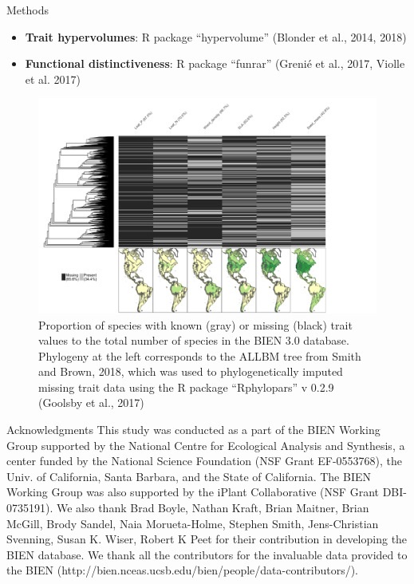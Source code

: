 \documentclass[final]{beamer}
\newlength{\onecolwid}
\begin{document}
\begin{frame}[t]
\begin{columns}[t]
\begin{column}{\onecolwid}
\begin{block}{Methods}
\begin{itemize}
	\item \textbf{Trait hypervolumes}: R package ``hypervolume'' (Blonder et al., 2014, 2018)
	\item \textbf{Functional distinctiveness}:  R package ``funrar''  (Greni\'e et al., 2017, Violle et al. 2017)
\end{itemize}
	\end{block}



\begin{figure}[h]
	\centering
	\includegraphics[width=1.05\textwidth]{./figures/Trait_sampling}
	\caption{ \footnotesize Proportion of species with known (gray) or missing (black) trait values to the total number of species in the BIEN 3.0 database. Phylogeny at the left corresponds to the ALLBM tree from Smith and Brown, 2018, which was used to phylogenetically imputed missing trait data using the R package ``Rphylopars'' v 0.2.9 (Goolsby et al., 2017)}
	\label{fig:sampling}
\end{figure}

	
	
\begin{block}{Acknowledgments}
\scriptsize This study was conducted as a part of the BIEN Working Group supported by the National Centre for Ecological Analysis and Synthesis, a center funded by the National Science Foundation (NSF Grant EF-0553768), the Univ. of California, Santa Barbara, and the State of California. The BIEN Working Group was also supported by the iPlant Collaborative (NSF Grant DBI- 0735191). We also thank Brad Boyle, Nathan Kraft, Brian Maitner, Brian McGill, Brody Sandel, Naia Morueta-Holme, Stephen Smith, Jens-Christian Svenning, Susan K. Wiser, Robert K Peet for their contribution in developing the BIEN database. We thank all the contributors for the invaluable data provided to the BIEN (http://bien.nceas.ucsb.edu/bien/people/data-contributors/). 
\end{block}



\end{column}
\end{columns}
\end{frame}
\end{document}
